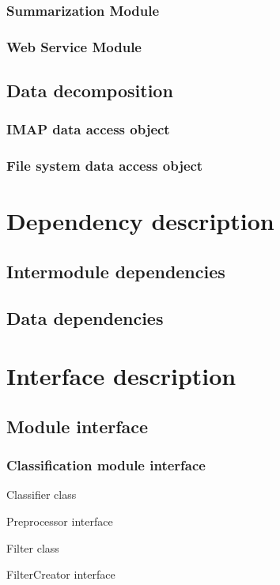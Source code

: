 \documentclass[12pt]{article}
\newenvironment{my_itemize}
{\begin{itemize}
  \setlength{\itemsep}{0cm}
  \setlength{\parskip}{0cm}}
{\end{itemize}}
\begin{document}
\subsubsection{Summarization Module}
\subsubsection{Web Service Module}

\subsection{Data decomposition}
\subsubsection{IMAP data access object}
\subsubsection{File system data access object}

\section{Dependency description}
\subsection{Intermodule dependencies}
\subsection{Data dependencies}

\section{Interface description}
\subsection{Module interface}
\subsubsection{Classification module interface}
\begin{my_itemize}
  \item Classifier class
  \item Preprocessor interface
  \item Filter class
  \item FilterCreator interface
\end{my_itemize}
\end{document}
